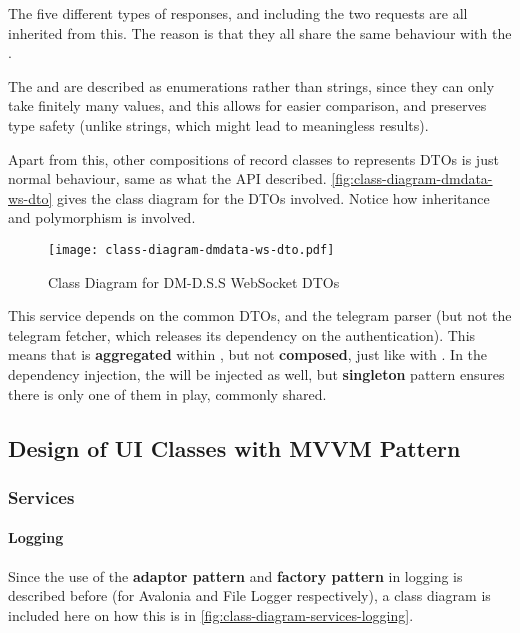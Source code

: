 The five different types of responses, and including the two requests are all inherited from this. The reason is that they all share the same behaviour with the .

The  and  are described as enumerations rather than strings, since they can only take finitely many values, and this allows for easier comparison, and preserves type safety (unlike strings, which might lead to meaningless results).

Apart from this, other compositions of record classes to represents DTOs is just normal behaviour, same as what the API described. \autoref{fig:class-diagram-dmdata-ws-dto} gives the class diagram for the DTOs involved. Notice how inheritance and polymorphism is involved.

\begin{figure}[htp]
    \centering
    \texttt{[image: class-diagram-dmdata-ws-dto.pdf]}
    \caption{Class Diagram for DM-D.S.S WebSocket DTOs}
    \label{fig:class-diagram-dmdata-ws-dto}
\end{figure}

This service depends on the common DTOs, and the telegram parser (but not the telegram fetcher, which releases its dependency on the authentication). This means that  is \textbf{aggregated} within , but not \textbf{composed}, just like with . In the dependency injection, the  will be injected as well, but \textbf{singleton} pattern ensures there is only one of them in play, commonly shared.

\subsection{Design of UI Classes with MVVM Pattern}

\subsubsection{Services}

\paragraph{Logging}

Since the use of the \textbf{adaptor pattern} and \textbf{factory pattern} in logging is described before (for Avalonia and File Logger respectively), a class diagram is included here on how this is in \autoref{fig:class-diagram-services-logging}.

